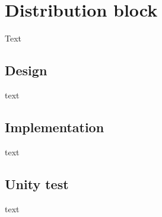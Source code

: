 \section{Distribution block}
Text

\subsection{Design}
text

\subsection{Implementation}
text

\subsection{Unity test}
text